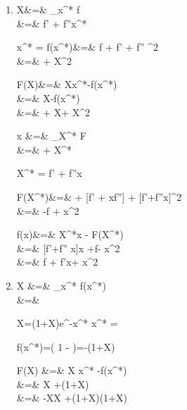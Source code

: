 \begin{enumerate}
\item 
\beq
{}
\eeq

\beqa
X&=&
\partial_{x^*} f
\\
&=&
f' + f''x^*
\label{eq-X-xstar}
\eeqa

\beq
x^* = 
\eeq
\beqa
f(x^*)&=& f
+
f' 
+
f''
^2
\\
&=&
+
X^2
\eeqa

\beqa
F(X)&=&
Xx^*-f(x^*)
\\
&=&
X
-f(x^*)
\\
&=&
+
X
+
X^2
\eeqa

\beqa
x &=&
\partial_{X^*} F
\\
&=& 
+
X^*
\eeqa

\beq
X^* = f' + f''x
\quad{}
\eeq

\beqa
F(X^*)&=&
+
[f' + xf'']
+
[f'+f''x]^2
\\
&=&
-f +  x^2
\eeqa


\beqa
f(x)&=& X^*x - F(X^*)
\\
&=&
[f'+f'' x]x
+f- x^2
\\
&=&
f + f'x+ x^2
\eeqa


\item
\beq
{}
\eeq

\beqa
X
&=&
\partial_{x^*} f(x^*)
\\
&=&
\eeqa

\beq
X=(1+X)e^{-x^*}
\eeq
\beq
x^* = \ln{}
\eeq

\beq
f(x^*)=\ln\left(
1 - 
\right)=-\ln(1+X)
\eeq

\beqa
F(X) &=& X x^* -f(x^*)
\\
&=&
X \ln{}
+\ln(1+X)
\\
&=&
-X\ln  X
+(1+X)\ln(1+X)
\eeqa
\end{enumerate}





